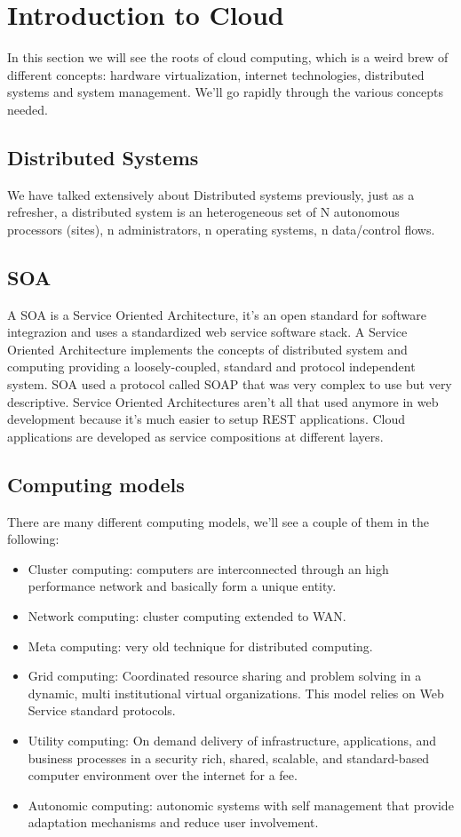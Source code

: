 \chapter{Introduction to Cloud}
In this section we will see the roots of cloud computing, which is a weird brew of different concepts: hardware virtualization, internet technologies, distributed systems and system management. \n
We'll go rapidly through the various concepts needed.
\section{Distributed Systems}
We have talked extensively about Distributed systems previously, just as a refresher, a distributed system is an heterogeneous set of N autonomous processors (sites), n administrators, n operating systems, n data/control flows.
\section{SOA}
A SOA is a Service Oriented Architecture, it's an open standard for software integrazion and uses a standardized web service software stack. \n
A Service Oriented Architecture implements the concepts of distributed system and computing providing a loosely-coupled, standard and protocol independent system. SOA used a protocol called SOAP that was very complex to use but very descriptive. Service Oriented Architectures aren't all that used anymore in web development because it's much easier to setup REST applications. \n
Cloud applications are developed as service compositions at different layers.
\section{Computing models}
There are many different computing models, we'll see a couple of them in the following:
\begin{itemize}
    \item Cluster computing: computers are interconnected through an high performance network and basically form a unique entity.
    \item Network computing: cluster computing extended to WAN.
    \item Meta computing: very old technique for distributed computing.
    \item Grid computing: Coordinated resource sharing and problem solving in a dynamic, multi institutional virtual organizations. \n
    This model relies on Web Service standard protocols.
    \item Utility computing: On demand delivery of infrastructure, applications, and business processes in a security rich, shared, scalable, and standard-based computer environment over the internet for a fee.
    \item Autonomic computing: autonomic systems with self management that provide adaptation mechanisms and reduce user involvement.
\end{itemize}
